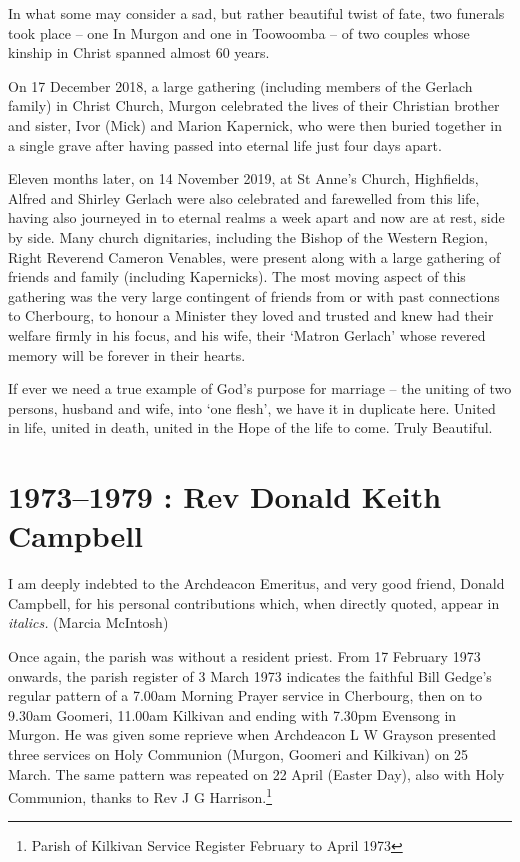 In what some may consider a sad, but rather beautiful twist of fate, two funerals took place -- one In Murgon and one in Toowoomba -- of two couples whose kinship in Christ spanned almost 60 years.

On 17 December 2018, a large gathering (including members of the Gerlach family) in Christ Church, Murgon celebrated the lives of their Christian brother and sister, Ivor (Mick) and Marion Kapernick, who were then buried together in a single grave after having passed into eternal life just four days apart.

Eleven months later, on 14 November 2019, at St Anne's Church, Highfields, Alfred and Shirley Gerlach were also celebrated and farewelled from this life, having also journeyed in to eternal realms a week apart and now are at rest, side by side. Many church dignitaries, including the Bishop of the Western Region, Right Reverend Cameron Venables, were present along with a large gathering of friends and family (including Kapernicks). The most moving aspect of this gathering was the very large contingent of friends from or with past connections to Cherbourg, to honour a Minister they loved and trusted and knew had their welfare firmly in his focus, and his wife, their `Matron Gerlach' whose revered memory will be forever in their hearts.

If ever we need a true example of God's purpose for marriage -- the uniting of two persons, husband and wife, into `one flesh', we have it in duplicate here. United in life, united in death, united in the Hope of the life to come. Truly Beautiful.

\hypertarget{rev-donald-keith-campbell}{%
\chapter{1973--1979 : Rev Donald Keith Campbell}\label{rev-donald-keith-campbell}}

I am deeply indebted to the Archdeacon Emeritus, and very good friend, Donald Campbell, for his personal contributions which, when directly quoted, appear in \emph{italics.} (Marcia McIntosh)

Once again, the parish was without a resident priest. From 17 February 1973 onwards, the parish register of 3 March 1973 indicates the faithful Bill Gedge's regular pattern of a 7.00am Morning Prayer service in Cherbourg, then on to 9.30am Goomeri, 11.00am Kilkivan and ending with 7.30pm Evensong in Murgon. He was given some reprieve when Archdeacon L W Grayson presented three services on Holy Communion (Murgon, Goomeri and Kilkivan) on 25 March. The same pattern was repeated on 22 April (Easter Day), also with Holy Communion, thanks to Rev J G Harrison.\footnote{Parish of Kilkivan Service Register February to April 1973}

